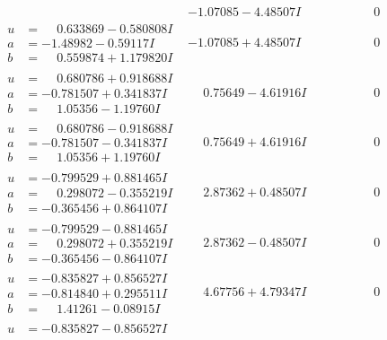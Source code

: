 \documentclass[1p]{elsarticle_modified}
\theoremstyle{definition}
\begin{document}
$$\begin{array}{c|c|c}
 & -1.07085 - 4.48507 I & \phantom{-0.000000 } 0 \\ \hline\begin{aligned}
u &= \phantom{-}0.633869 - 0.580808 I \\
a &= -1.48982 - 0.59117 I \\
b &= \phantom{-}0.559874 + 1.179820 I\end{aligned}
 & -1.07085 + 4.48507 I & \phantom{-0.000000 } 0 \\ \hline\begin{aligned}
u &= \phantom{-}0.680786 + 0.918688 I \\
a &= -0.781507 + 0.341837 I \\
b &= \phantom{-}1.05356 - 1.19760 I\end{aligned}
 & \phantom{-}0.75649 - 4.61916 I & \phantom{-0.000000 } 0 \\ \hline\begin{aligned}
u &= \phantom{-}0.680786 - 0.918688 I \\
a &= -0.781507 - 0.341837 I \\
b &= \phantom{-}1.05356 + 1.19760 I\end{aligned}
 & \phantom{-}0.75649 + 4.61916 I & \phantom{-0.000000 } 0 \\ \hline\begin{aligned}
u &= -0.799529 + 0.881465 I \\
a &= \phantom{-}0.298072 - 0.355219 I \\
b &= -0.365456 + 0.864107 I\end{aligned}
 & \phantom{-}2.87362 + 0.48507 I & \phantom{-0.000000 } 0 \\ \hline\begin{aligned}
u &= -0.799529 - 0.881465 I \\
a &= \phantom{-}0.298072 + 0.355219 I \\
b &= -0.365456 - 0.864107 I\end{aligned}
 & \phantom{-}2.87362 - 0.48507 I & \phantom{-0.000000 } 0 \\ \hline\begin{aligned}
u &= -0.835827 + 0.856527 I \\
a &= -0.814840 + 0.295511 I \\
b &= \phantom{-}1.41261 - 0.08915 I\end{aligned}
 & \phantom{-}4.67756 + 4.79347 I & \phantom{-0.000000 } 0 \\ \hline\begin{aligned}
u &= -0.835827 - 0.856527 I \\

\end{aligned}
\end{array}$$
\end{document}
